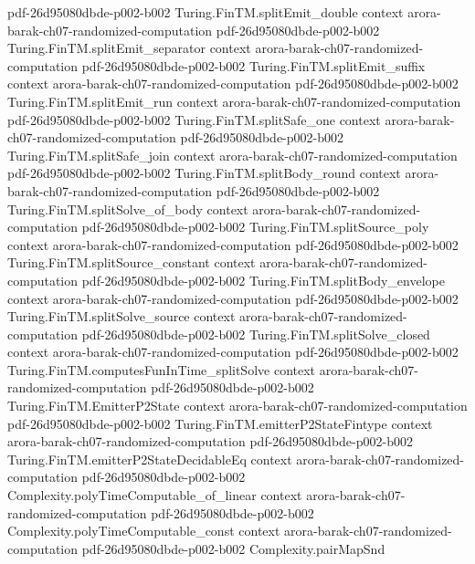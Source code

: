 \begin{theorem}
  {pdf-26d95080dbde-p002-b002}
\proofstep
  {Turing.FinTM.splitEmit_double}
  {context}
  {arora-barak-ch07-randomized-computation}
  {pdf-26d95080dbde-p002-b002}
\proofstep
  {Turing.FinTM.splitEmit_separator}
  {context}
  {arora-barak-ch07-randomized-computation}
  {pdf-26d95080dbde-p002-b002}
\proofstep
  {Turing.FinTM.splitEmit_suffix}
  {context}
  {arora-barak-ch07-randomized-computation}
  {pdf-26d95080dbde-p002-b002}
\proofstep
  {Turing.FinTM.splitEmit_run}
  {context}
  {arora-barak-ch07-randomized-computation}
  {pdf-26d95080dbde-p002-b002}
\proofstep
  {Turing.FinTM.splitSafe_one}
  {context}
  {arora-barak-ch07-randomized-computation}
  {pdf-26d95080dbde-p002-b002}
\proofstep
  {Turing.FinTM.splitSafe_join}
  {context}
  {arora-barak-ch07-randomized-computation}
  {pdf-26d95080dbde-p002-b002}
\proofstep
  {Turing.FinTM.splitBody_round}
  {context}
  {arora-barak-ch07-randomized-computation}
  {pdf-26d95080dbde-p002-b002}
\proofstep
  {Turing.FinTM.splitSolve_of_body}
  {context}
  {arora-barak-ch07-randomized-computation}
  {pdf-26d95080dbde-p002-b002}
\proofstep
  {Turing.FinTM.splitSource_poly}
  {context}
  {arora-barak-ch07-randomized-computation}
  {pdf-26d95080dbde-p002-b002}
\proofstep
  {Turing.FinTM.splitSource_constant}
  {context}
  {arora-barak-ch07-randomized-computation}
  {pdf-26d95080dbde-p002-b002}
\proofstep
  {Turing.FinTM.splitBody_envelope}
  {context}
  {arora-barak-ch07-randomized-computation}
  {pdf-26d95080dbde-p002-b002}
\proofstep
  {Turing.FinTM.splitSolve_source}
  {context}
  {arora-barak-ch07-randomized-computation}
  {pdf-26d95080dbde-p002-b002}
\proofstep
  {Turing.FinTM.splitSolve_closed}
  {context}
  {arora-barak-ch07-randomized-computation}
  {pdf-26d95080dbde-p002-b002}
\proofstep
  {Turing.FinTM.computesFunInTime_splitSolve}
  {context}
  {arora-barak-ch07-randomized-computation}
  {pdf-26d95080dbde-p002-b002}
\proofstep
  {Turing.FinTM.EmitterP2State}
  {context}
  {arora-barak-ch07-randomized-computation}
  {pdf-26d95080dbde-p002-b002}
\proofstep
  {Turing.FinTM.emitterP2StateFintype}
  {context}
  {arora-barak-ch07-randomized-computation}
  {pdf-26d95080dbde-p002-b002}
\proofstep
  {Turing.FinTM.emitterP2StateDecidableEq}
  {context}
  {arora-barak-ch07-randomized-computation}
  {pdf-26d95080dbde-p002-b002}
\proofstep
  {Complexity.polyTimeComputable_of_linear}
  {context}
  {arora-barak-ch07-randomized-computation}
  {pdf-26d95080dbde-p002-b002}
\proofstep
  {Complexity.polyTimeComputable_const}
  {context}
  {arora-barak-ch07-randomized-computation}
  {pdf-26d95080dbde-p002-b002}
\proofstep
  {Complexity.pairMapSnd}

\end{theorem}
